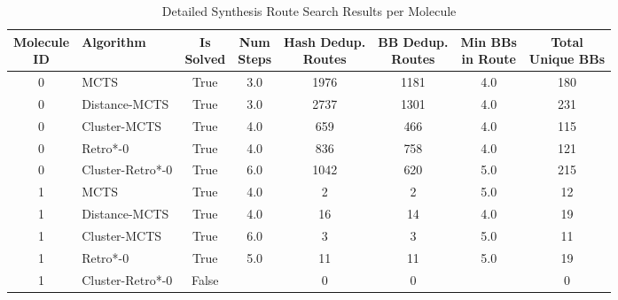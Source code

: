 \begin{table}[h]
\centering
\caption{Detailed Synthesis Route Search Results per Molecule}
\label{tab:summary_results_detailed}
\begin{tabular*}{\textwidth}{@{\extracolsep{\fill}}clcccccc}
\toprule
\makecell[c]{Molecule \\ ID} & \textbf{Algorithm} & \makecell[c]{Is \\ Solved} & \makecell[c]{Num \\ Steps} & \makecell[c]{Hash Dedup. \\ Routes} & \makecell[c]{BB Dedup. \\ Routes} & \makecell[c]{Min BBs \\ in Route} & \makecell[c]{Total \\ Unique BBs} \\
\midrule
0 & MCTS & True & 3.0 & 1976 & 1181 & 4.0 & 180 \\
0 & Distance-MCTS & True & 3.0 & 2737 & 1301 & 4.0 & 231 \\
0 & Cluster-MCTS & True & 4.0 & 659 & 466 & 4.0 & 115 \\
0 & Retro*-0 & True & 4.0 & 836 & 758 & 4.0 & 121 \\
0 & Cluster-Retro*-0 & True & 6.0 & 1042 & 620 & 5.0 & 215 \\
1 & MCTS & True & 4.0 & 2 & 2 & 5.0 & 12 \\
1 & Distance-MCTS & True & 4.0 & 16 & 14 & 4.0 & 19 \\
1 & Cluster-MCTS & True & 6.0 & 3 & 3 & 5.0 & 11 \\
1 & Retro*-0 & True & 5.0 & 11 & 11 & 5.0 & 19 \\
1 & Cluster-Retro*-0 & False &  & 0 & 0 &  & 0 \\
\bottomrule
\end{tabular*}
\end{table}